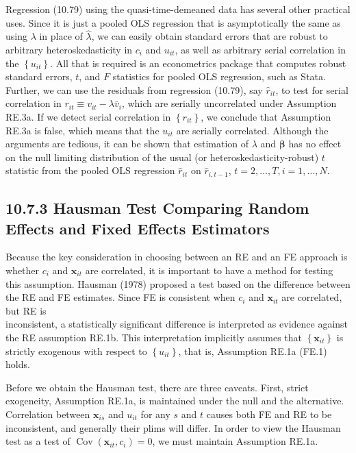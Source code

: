 \documentclass[10pt]{article}
\begin{document}
Regression (10.79) using the quasi-time-demeaned data has several other practical uses. Since it is just a pooled OLS regression that is asymptotically the same as using $\lambda$ in place of $\hat{\lambda}$, we can easily obtain standard errors that are robust to arbitrary heteroskedasticity in $c_{i}$ and $u_{i t}$, as well as arbitrary serial correlation in the $\left\{u_{i t}\right\}$. All that is required is an econometrics package that computes robust standard errors, $t$, and $F$ statistics for pooled OLS regression, such as Stata. Further, we can use the residuals from regression (10.79), say $\hat{r}_{i t}$, to test for serial correlation in $r_{i t} \equiv v_{i t}-\lambda \bar{v}_{i}$, which are serially uncorrelated under Assumption RE.3a. If we detect serial correlation in $\left\{r_{i t}\right\}$, we conclude that Assumption RE.3a is false, which means that the $u_{i t}$ are serially correlated. Although the arguments are tedious, it can be shown that estimation of $\lambda$ and $\boldsymbol{\beta}$ has no effect on the null limiting distribution of the usual (or heteroskedasticity-robust) $t$ statistic from the pooled OLS regression $\hat{r}_{i t}$ on $\hat{r}_{i, t-1}$, $t=2, \ldots, T, i=1, \ldots, N$.

\subsection*{10.7.3 Hausman Test Comparing Random Effects and Fixed Effects Estimators}
Because the key consideration in choosing between an RE and an FE approach is whether $c_{i}$ and $\mathbf{x}_{i t}$ are correlated, it is important to have a method for testing this assumption. Hausman (1978) proposed a test based on the difference between the RE and FE estimates. Since FE is consistent when $c_{i}$ and $\mathbf{x}_{i t}$ are correlated, but RE is\\
inconsistent, a statistically significant difference is interpreted as evidence against the RE assumption RE.1b. This interpretation implicitly assumes that $\left\{\mathbf{x}_{i t}\right\}$ is strictly exogenous with respect to $\left\{u_{i t}\right\}$, that is, Assumption RE.1a (FE.1) holds.

Before we obtain the Hausman test, there are three caveats. First, strict exogeneity, Assumption RE.1a, is maintained under the null and the alternative. Correlation between $\mathbf{x}_{i s}$ and $u_{i t}$ for any $s$ and $t$ causes both FE and RE to be inconsistent, and generally their plims will differ. In order to view the Hausman test as a test of $\operatorname{Cov}\left(\mathbf{x}_{i t}, c_{i}\right)=0$, we must maintain Assumption RE.1a.
\end{document}
